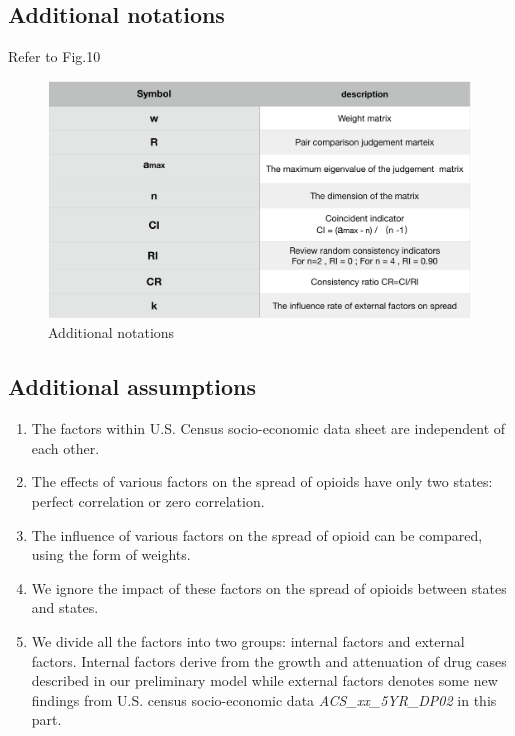 \documentclass[12pt]{article}
\begin{document}
\subsection{Additional notations}
Refer to Fig.10
\begin{figure}[!htbp]
\small
\centering
\includegraphics[width=16cm]{Fig/Additional_notations}
\caption{Additional notations}
\end{figure}

\subsection{Additional assumptions}

\begin{enumerate}[\bfseries 1.]

\item The factors within U.S. Census socio-economic data sheet are independent of each other.

\item The effects of various factors on the spread of opioids have only two states: perfect correlation or zero correlation.

\item The influence of various factors on the spread of opioid  can be compared, using the form of weights.

\item We ignore the impact of these factors on the spread of opioids between states and states.

\item We divide all the factors into two groups: internal factors and external factors. Internal factors derive from the growth and attenuation of drug cases described in our preliminary model while external factors denotes some new findings from U.S. census socio-economic data \textit{ACS\_xx\_5YR\_DP02} in this part.

\end{enumerate}
\end{document}
